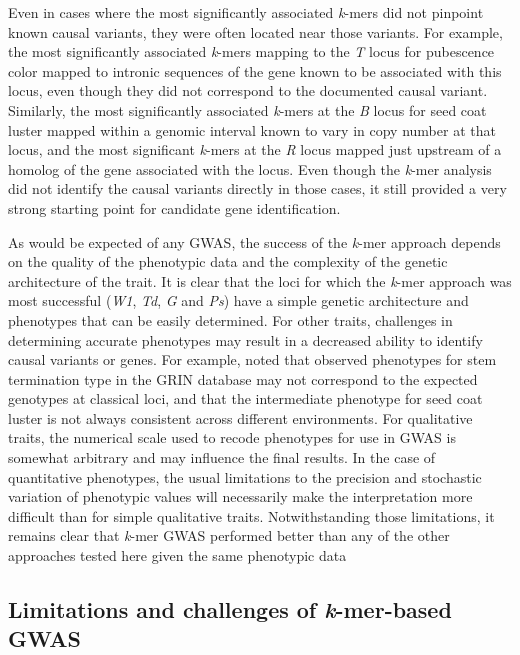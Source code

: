 Even in cases where the most significantly associated \emph{k}-mers did not
pinpoint known causal variants, they were often located near
those variants. For example, the most significantly associated \emph{k}-mers
mapping to the \emph{T} locus for pubescence color mapped to intronic sequences
of the gene known to be associated with this locus, even though they did not
correspond to the documented causal variant. Similarly, the most significantly associated
\emph{k}-mers at the \emph{B} locus for seed coat luster mapped within a
genomic interval known to vary in copy number at that locus, and the most
significant \emph{k}-mers at the \emph{R} locus mapped just upstream of a
homolog of the gene associated with the locus. Even though the \emph{k}-mer
analysis did not identify the causal variants directly in those cases, it still
provided a very strong starting point for candidate gene identification.

As would be expected of any GWAS, the success of the \emph{k}-mer approach
depends on the quality of the phenotypic data and the complexity of the genetic
architecture of the trait. It is clear that the loci for which the
\emph{k}-mer approach was most successful (\emph{W1}, \emph{Td}, \emph{G} and
\emph{Ps}) have a simple genetic architecture and phenotypes that can be easily
determined. For other traits, challenges in determining accurate phenotypes may
result in a decreased ability to identify causal variants or genes. For
example, \cite{bandillo2017} noted that observed phenotypes for stem
termination type in the GRIN database may not correspond to the expected
genotypes at classical loci, and that the intermediate phenotype for seed coat
luster is not always consistent across different environments. For qualitative
traits, the numerical scale used to recode phenotypes for use in GWAS is somewhat
arbitrary and may influence the final results. In the case of quantitative
phenotypes, the usual limitations to the precision and stochastic variation of
phenotypic values will necessarily make the interpretation more difficult than
for simple qualitative traits. Notwithstanding those limitations, it remains
clear that \textit{k}-mer GWAS performed better than any of the other
approaches tested here given the same phenotypic data

\subsection{Limitations and challenges of \emph{k}-mer-based GWAS}
\label{limitations-of-kmers-GWAS}

